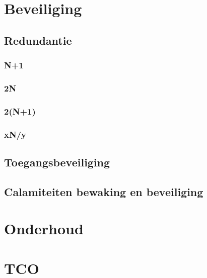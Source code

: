 \documentclass[a4paper,12pt,twoside,openright,titlepage]{book}
\begin{document}
\chapter{Beveiliging}
\section{Redundantie}

\subsection{N+1}

\subsection{2N}

\subsection{2(N+1)}

\subsection{xN/y}

\section{Toegangsbeveiliging}

\section{Calamiteiten bewaking en beveiliging}


\chapter{Onderhoud}

\chapter{TCO}

\printindex
\end{document}

